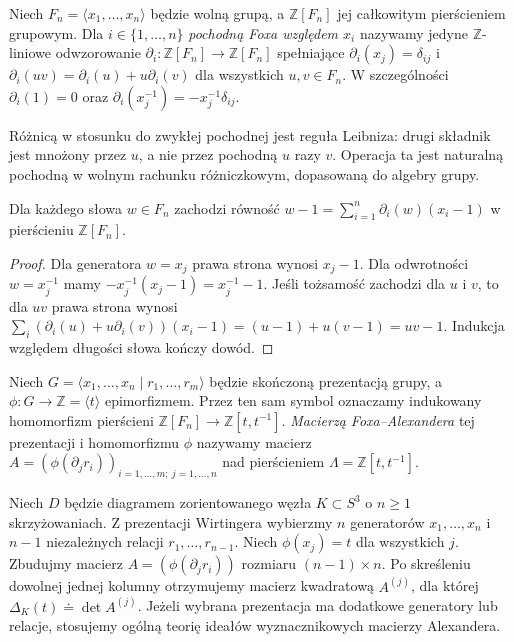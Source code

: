 \begin{definicja}
Niech $F_n=\langle x_1,\dots,x_n\rangle$ będzie wolną grupą,
a $\mathbb Z[F_n]$ jej całkowitym pierścieniem grupowym.
Dla $i\in\{1,\dots,n\}$ \emph{pochodną Foxa względem $x_i$}
nazywamy jedyne $\mathbb Z$-liniowe odwzorowanie
$\partial_i\colon\mathbb Z[F_n]\to\mathbb Z[F_n]$
spełniające $\partial_i(x_j)=\delta_{ij}$ i
$\partial_i(uv)=\partial_i(u)+u\partial_i(v)$
dla wszystkich $u,v\in F_n$. W szczególności
$\partial_i(1)=0$ oraz
$\partial_i(x_j^{-1})=-x_j^{-1}\delta_{ij}$.
\end{definicja}

Różnicą w stosunku do zwykłej pochodnej jest reguła
Leibniza: drugi składnik jest mnożony przez $u$, a nie
przez pochodną $u$ razy $v$. Operacja ta jest naturalną
pochodną w wolnym rachunku różniczkowym, dopasowaną
do algebry grupy.

\begin{lemat}
Dla każdego słowa $w\in F_n$ zachodzi równość
$w-1=\sum_{i=1}^n\partial_i(w)(x_i-1)$
w pierścieniu $\mathbb Z[F_n]$.
\end{lemat}

\begin{proof}
Dla generatora $w=x_j$ prawa strona wynosi $x_j-1$.
Dla odwrotności $w=x_j^{-1}$ mamy
$-x_j^{-1}(x_j-1)=x_j^{-1}-1$. Jeśli tożsamość
zachodzi dla $u$ i $v$, to dla $uv$ prawa strona wynosi
$\sum_i(\partial_i(u)+u\partial_i(v))(x_i-1)
=(u-1)+u(v-1)=uv-1$.
Indukcja względem długości słowa kończy dowód.
\end{proof}

\begin{definicja}
Niech $G=\langle x_1,\dots,x_n\mid r_1,\dots,r_m\rangle$
będzie skończoną prezentacją grupy, a
$\phi\colon G\to\mathbb Z=\langle t\rangle$ epimorfizmem.
Przez ten sam symbol oznaczamy indukowany homomorfizm
pierścieni $\mathbb Z[F_n]\to\mathbb Z[t,t^{-1}]$.
\emph{Macierzą Foxa--Alexandera} tej prezentacji i
homomorfizmu $\phi$ nazywamy macierz
$A=(\phi(\partial_jr_i))_{i=1,\dots,m;\ j=1,\dots,n}$
nad pierścieniem $\Lambda=\mathbb Z[t,t^{-1}]$.
\end{definicja}

\begin{twierdzenie}
Niech $D$ będzie diagramem zorientowanego węzła
$K\subset S^3$ o $n\geq1$ skrzyżowaniach.
Z prezentacji Wirtingera wybierzmy $n$ generatorów
$x_1,\dots,x_n$ i $n-1$ niezależnych relacji
$r_1,\dots,r_{n-1}$. Niech
$\phi(x_j)=t$ dla wszystkich $j$. Zbudujmy macierz
$A=(\phi(\partial_jr_i))$ rozmiaru $(n-1)\times n$.
Po skreśleniu dowolnej jednej kolumny otrzymujemy
macierz kwadratową $A^{(j)}$, dla której
$\Delta_K(t)\doteq\det A^{(j)}$.
Jeżeli wybrana prezentacja ma dodatkowe generatory
lub relacje, stosujemy ogólną teorię ideałów
wyznacznikowych macierzy Alexandera.
\end{twierdzenie}

